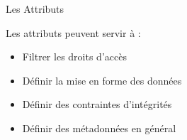 \begin{frame}{Les Attributs}

  Les attributs peuvent servir à :
  \begin{itemize}
  \item Filtrer les droits d'accès
  \item Définir la mise en forme des données
\item Définir des contraintes d'intégrités
\item Définir des métadonnées en général
  \end{itemize}
\end{frame}